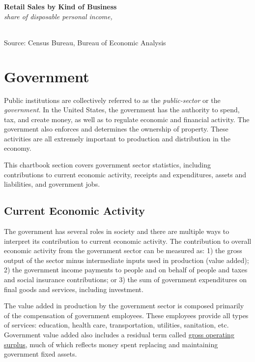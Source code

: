 \documentclass{report}
\newcommand{\tbllink}[1]{\href{https://raw.githubusercontent.com/bdecon/US-chartbook/master/chartbook/data/#1}{\faTable}}
\begin{document}
{\begin{minipage}{0.8\textwidth}
\normalsize \textbf{Retail Sales by Kind of Business}\\
\footnotesize{\textit{share of disposable personal income, }}
\vspace{-1mm}

\hspace*{-2mm} \begin{tikzpicture}

\end{tikzpicture}\\
\footnotesize{Source: Census Bureau, Bureau of Economic Analysis} \hfill \tbllink{rs_ind.csv}
\end{minipage}
\newpage
\begin{minipage}{0.76\textwidth}
\hypertarget{gov}{}
\section*{Government}
\small Public institutions are collectively referred to as the \textit{public-sector} or the \textit{government}. In the United States, the government has the authority to spend, tax, and create money, as well as to regulate economic and financial activity. The government also enforces and determines the ownership of property. These activities are all extremely important to production and distribution in the economy.

This chartbook section covers government sector statistics, including contributions to current economic activity, receipts and expenditures, assets and liabilities, and government jobs.
\subsection*{Current Economic Activity}
\small The government has several roles in society and there are multiple ways to interpret its contribution to current economic activity. The contribution to overall economic activity from the government sector can be measured as: 1) the gross output of the sector minus intermediate inputs used in production (value added); 2) the government income payments to people and on behalf of people and taxes and social insurance contributions; or 3) the sum of government expenditures on final goods and services, including investment. 

The value added in production by the government sector is composed primarily of the compensation of government employees. These employees provide all types of services: education, health care, transportation, utilities, sanitation, etc. Government value added also includes a residual term called \href{https://www.bea.gov/help/glossary/gross-operating-surplus}{gross operating surplus}, much of which reflects money spent replacing and maintaining government fixed assets. 
\end{minipage}
\vspace{2mm}

}
\end{document}
